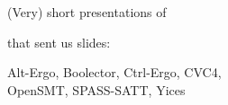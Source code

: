 \documentclass{beamer}
\begin{document}
\begin{frame}{}
(Very) short presentations of

  \begin{center}
    \vfill

    {\huge {}}

    \vfill
  \end{center}

  that sent us slides:

  \vfill

  \begin{center}
    Alt-Ergo, Boolector, Ctrl-Ergo, CVC4, \\ OpenSMT, SPASS-SATT, Yices
  \end{center}
\end{frame}

{
  
  
  
  
  
  
  
}


\begin{frame}{}
  \begin{center}
    \vfill
      {\huge {}}
    \vfill
  \end{center}
\end{frame}

\end{document}

